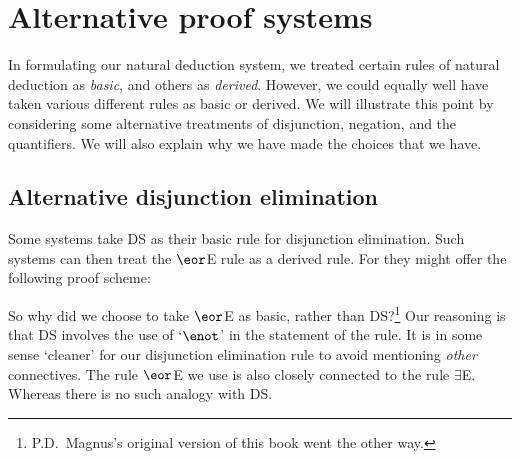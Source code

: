 
\chapter{Alternative proof systems}
In formulating our natural deduction system, we treated certain rules of natural deduction as \emph{basic}, and others as \emph{derived}. However, we could equally well have taken various different rules as basic or derived. We will illustrate this point by considering some alternative treatments of disjunction, negation, and the quantifiers. We will also explain why we have made the choices that we have.


\section{Alternative disjunction elimination}
Some systems take DS as their basic rule for disjunction elimination. Such systems can then treat the $\eor$E rule as a derived rule. For they might offer the following proof scheme: 
	\begin{fitchproof}
		\open
			 {}
			\ellipsesline
		\close
		\open
			\ellipsesline
		\close
		\LEM
		\open
		\close
		\open
		\open
		\close
	\close
\end{fitchproof}
So why did we choose to take $\eor$E as basic, rather than DS?\footnote{P.D.\ Magnus's original version of this book went the other way.} Our reasoning is that DS involves the use of `$\enot$' in the statement of the rule. It is in some sense `cleaner' for our disjunction elimination rule to avoid mentioning \emph{other} connectives. 
The rule $\eor$E we use is also closely connected to the rule $\exists$E. Whereas there is no such analogy with DS. 


